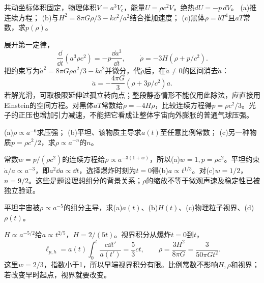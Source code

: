 \begin{exercise}
共动坐标体积固定，物理体积$V=a^3V_c$，能量$U=\rho c^2V$，绝热$dU=-p\,dV$。
(a)推连续方程；
(b)与$H^2=8\pi G\rho/3-kc^2/a^2$结合推加速度；
(c)黑体$\rho=bT^4$且$aT$常数，求$p(\rho)$。
\end{exercise}
\begin{solution}
展开第一定律，
\[
 \frac{\dd}{\dd t}(a^3\rho c^2)=-p\frac{\dd a^3}{\dd t},
 \qquad \dot\rho=-3H(\rho+p/c^2).
\]
把约束写为$\dot a^2=8\pi G\rho a^2/3-kc^2$并微分，代$\dot\rho$后，在$\dot a\ne0$的区间消去$\dot a$：
\[
 \ddot a=-\frac{4\pi G}{3}(\rho+3p/c^2)a .
\]
若解光滑，可取极限延伸过孤立转向点；整段静态情形不能仅用此除法，应直接用Einstein的空间方程。对黑体$aT$常数给$\dot\rho=-4H\rho$，比较连续方程得$p=\rho c^2/3$。光子的正压也增加引力减速，不能把它看成让整体宇宙向外膨胀的普通气球压强。
\end{solution}

\begin{exercise}
(a)$\rho\propto a^{-6}$求压强；
(b)平坦、该物质主导求$a(t)$至任意比例常数；
(c)另一种物质$p=\rho c^2/2$，求$\rho\propto a^{-n}$的$n$。
\end{exercise}
\begin{solution}
常数$w=p/(\rho c^2)$的连续方程给$\rho\propto a^{-3(1+w)}$，所以(a)$w=1,p=\rho c^2$。平坦约束$\dot a/a\propto a^{-3}$，即$a^2\dd a\propto\dd t$，选择爆炸时刻为$t=0$得(b)$a\propto t^{1/3}$。对(c)$w=1/2$，$n=9/2$。这些是题设理想组分的背景关系；$\rho$的缩放不等于微观声速及稳定性已被独立验证。
\end{solution}

\begin{exercise}
平坦宇宙被$\rho\propto a^{-5}$的组分主导，求(a)$a(t)$、(b)$H(t)$、(c)物理粒子视界、(d)$\rho(t)$。
\end{exercise}
\begin{solution}
$H\propto a^{-5/2}$给$a\propto t^{2/5}$，$H=2/(5t)$。视界积分从爆炸$t=0$到$t$，
\[
 \ell_{p,h}=a(t)\int_0^t\frac{c\dd t'}{a(t')}
 =\frac53ct,\qquad
 \rho=\frac{3H^2}{8\pi G}=\frac{3}{50\pi Gt^2}.
\]
这里$w=2/3$，指数小于1，所以早端视界积分有限。比例常数不影响$H,\rho$和视界；若改变早时起点，视界就要改变。
\end{solution}

